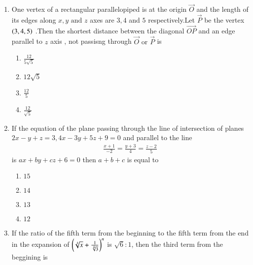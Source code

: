 \documentclass[journal,12pt,onecolumn]{IEEEtran}
\theoremstyle{remark}
\begin{document}
\begin{enumerate}
    \begin{multicols}{2}
    \begin{enumerate}
        \item $ A \subset B , A \neq B $
        \item $ A \cap B = \emptyset$
        \item $A = B$
        \item $B \subset C , A \neq B$
    \end{enumerate}
    \end{multicols}
    \item One vertex of a rectangular parallelopiped is at the origin $\vec{O}$ and the length of its edges along $ x , y \text{ and } z $ axes are $ 3 , 4 $ and $ 5 $ respectively.Let $\vec{P}$ be the vertex $\left( 3 , 4 , 5 \right)$ .Then the shortest distance between the diagonal $\vec{OP}$ and an edge parallel to $z$ axis , not passisng through $ \vec{O} \text{ or } \vec{P}$ is
    \begin{multicols}{2}
        \begin{enumerate}
            \item $\frac{12}{5\sqrt{5}}$\\
            \item $12 \sqrt{5}$
            \item $\frac{12}{5}$\\
            \item $\frac{12}{\sqrt{5}}$
        \end{enumerate}
    \end{multicols}
    \item If the equation of the plane passing through the line of intersection of planes $2x - y + z = 3 , 4x -3y +5z+9 =0$ and parallel to the line 
    \begin{align}
        \frac{x+1}{-2} = \frac{y+3}{4} = \frac{z-2}{5}
    \end{align}
    is $ax+ by + cz + 6 = 0 $ then $a + b + c$ is equal to
    \begin{multicols}{2}
    \begin{enumerate}
        \item $15$
        \item $14$\\
        \item $13$
        \item $12$
    \end{enumerate}
    \end{multicols}
    \item If the ratio of the fifth term from the beginning to the fifth term from the end in the expansion of $\left(\sqrt[4]{x} + \frac{1}{\sqrt[4]{3}}\right)^n$ is $\sqrt{6} \colon 1$, then the third term from the beggining is 

\end{enumerate}
\end{document}
